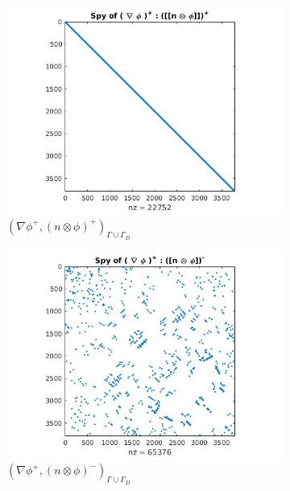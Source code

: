 \documentclass[a4paper,twoside,openright]{book}
\begin{document}
\begin{figure}
  \begin{subfigure}{0.5\textwidth}
    \includegraphics[width=\linewidth]{figure31.jpg}
\caption{$( \nabla \phi^+ ,(n \otimes \phi)^+)_{\Gamma \cup \Gamma_D}$}
  \label{fig:figure31}
  \end{subfigure}
  \begin{subfigure}{0.5\textwidth}
    \includegraphics[width=\linewidth]{figure32.jpg}
  \caption{$( \nabla \phi^+ ,(n \otimes \phi)^-)_{\Gamma \cup \Gamma_D}$}
  \label{fig:figure32}
  \end{subfigure}
    \begin{subfigure}{0.5\textwidth}

\end{subfigure}
\end{figure}
\end{document}
